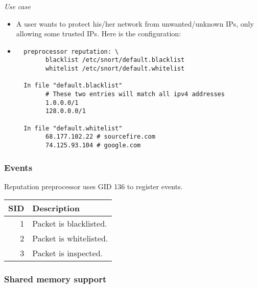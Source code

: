 \documentclass[english]{report}
\begin{document}
\textit{Use case}
\begin{itemize}
 \item[] A user wants to protect his/her network from unwanted/unknown IPs, only allowing 
  some trusted IPs. Here is the configuration:
\item[] \footnotesize
\begin{verbatim}  
  preprocessor reputation: \
        blacklist /etc/snort/default.blacklist
        whitelist /etc/snort/default.whitelist
  
  In file "default.blacklist"
        # These two entries will match all ipv4 addresses  
        1.0.0.0/1  
        128.0.0.0/1
  
  In file "default.whitelist"
        68.177.102.22 # sourcefire.com
        74.125.93.104 # google.com
\end{verbatim}
\end{itemize}
\normalsize

\subsubsection{Events}
Reputation preprocessor uses GID 136 to register events.
\begin{longtable}{|r|p{13.5cm}|}

\hline
SID & Description\\
\hline
 1  & Packet is blacklisted. \\
\hline
 2  & Packet is whitelisted. \\
\hline
 3  & Packet is inspected. \\
\hline
\end{longtable}
\subsubsection{Shared memory support}
\end{document}
